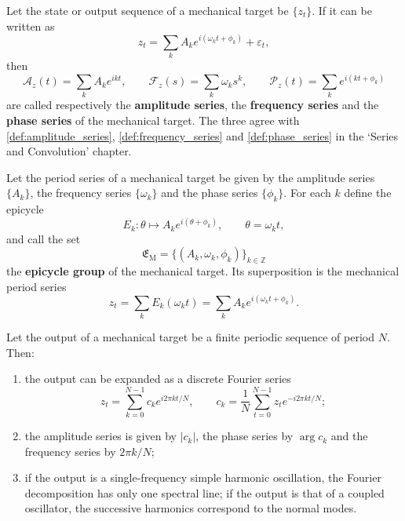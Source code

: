 \begin{definition}\label{def:mech_series}
Let the state or output sequence of a mechanical target be $\{z_t\}$. If it can be written as
\[
z_t=\sum_k A_k e^{i(\omega_k t+\phi_k)}+\varepsilon_t,
\]
then
\[
\mathcal A_z(t)=\sum_k A_k e^{ikt},\qquad
\mathcal F_z(s)=\sum_k \omega_k s^k,\qquad
\mathcal P_z(t)=\sum_k e^{i(kt+\phi_k)}
\]
are called respectively the \textbf{amplitude series}, the \textbf{frequency series} and the \textbf{phase series} of the mechanical target. The three agree with \cref{def:amplitude_series}, \cref{def:frequency_series} and \cref{def:phase_series} in the `Series and Convolution' chapter.
\end{definition}

\begin{definition}\label{def:mech_epicycle_group}
Let the period series of a mechanical target be given by the amplitude series $\{A_k\}$, the frequency series $\{\omega_k\}$ and the phase series $\{\phi_k\}$. For each $k$ define the epicycle
\[
E_k:\theta\mapsto A_k e^{i(\theta+\phi_k)},\qquad \theta=\omega_k t,
\]
and call the set
\[
\mathfrak E_{\mathrm{M}}=\{(A_k,\omega_k,\phi_k)\}_{k\in\mathbb Z}
\]
the \textbf{epicycle group} of the mechanical target. Its superposition is the mechanical period series
\[
z_t=\sum_k E_k(\omega_k t)=\sum_k A_k e^{i(\omega_k t+\phi_k)}.
\]
\end{definition}

\begin{theorem}\label{thm:mech_series_reconstruction}
Let the output of a mechanical target be a finite periodic sequence of period $N$. Then:
\begin{enumerate}[label=(\roman*)]
    \item the output can be expanded as a discrete Fourier series
    \[
    z_t=\sum_{k=0}^{N-1}c_k e^{i2\pi kt/N},\qquad
    c_k=\frac1N\sum_{t=0}^{N-1}z_t e^{-i2\pi kt/N};
    \]
    \item the amplitude series is given by $|c_k|$, the phase series by $\arg c_k$ and the frequency series by $2\pi k/N$;
    \item if the output is a single-frequency simple harmonic oscillation, the Fourier decomposition has only one spectral line; if the output is that of a coupled oscillator, the successive harmonics correspond to the normal modes.
\end{enumerate}
\end{theorem}

